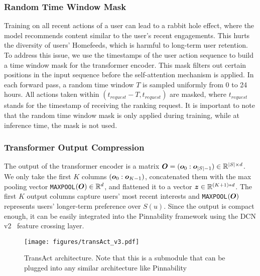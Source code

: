 \subsubsection{Random Time Window Mask}
Training on all recent actions of a user can lead to a rabbit hole effect, where the model recommends content similar to the user's recent engagements.
This hurts the diversity of users' Homefeeds, which is harmful to long-term user retention.
To address this issue, we use the timestamps of the user action sequence to build a time window mask for the transformer encoder. 
This mask filters out certain positions in the input sequence before the self-attention mechanism is applied. 
In each forward pass, a random time window $T$ is sampled uniformly from 0 to 24 hours. All actions taken within $(t_{request} - T, t_{request})$ are masked, where $t_{request}$ stands for the timestamp of receiving the ranking request. It is important to note that the random time window mask is only applied during training, while at inference time, the mask is not used. 

\subsubsection{Transformer Output Compression}
The output of the transformer encoder is a matrix $\boldsymbol{O} = (\boldsymbol{o}_0:\boldsymbol{o}_{|S|-1})\in \mathbb{R} ^ {|S| \times d}$. We only take the first $K$ columns $(\boldsymbol{o}_0:\boldsymbol{o}_{K-1})$, concatenated them with the max pooling vector \texttt{MAXPOOL}$(\boldsymbol{O}) \in \mathbb{R}^{d}$, and flattened it to a vector $\boldsymbol{z} \in \mathbb{R} ^{(K + 1) * d}$. The first $K$ output columns capture  users’ most recent interests and \texttt{MAXPOOL}$(\boldsymbol{O})$ represents users' longer-term preference over $S(u)$. Since the output is compact enough, it can be easily integrated into the Pinnability framework using the DCN v2~\cite{DCNv2}  feature crossing layer.




\begin{figure}[h]
  \centering
  \texttt{[image: figures/transAct\_v3.pdf]}
  \caption{TransAct architecture. Note that this is a submodule that can be plugged into any similar architecture like Pinnability}
  \label{fig:seq_encoder}
\end{figure}


